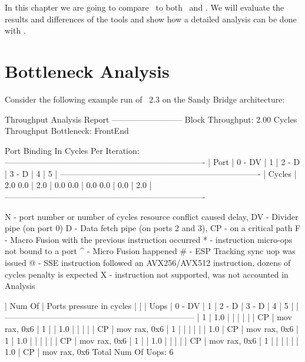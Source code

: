 In this chapter we are going to compare \suaca\ to both \iaca\ and \osaca. We will evaluate the results and differences of the tools and show how a detailed analysis can be done with \suaca.

\section{Bottleneck Analysis}

Consider the following example run of \iaca\ $2.3$ on the Sandy Bridge architecture:

\begin{example}
        Throughput Analysis Report
        --------------------------
        Block Throughput: 2.00 Cycles       Throughput Bottleneck: FrontEnd
        
        Port Binding In Cycles Per Iteration:
        -------------------------------------------------------------------------
        |  Port  |  0   -  DV  |  1   |  2   -  D   |  3   -  D   |  4   |  5   |
        -------------------------------------------------------------------------
        | Cycles | 2.0    0.0  | 2.0  | 0.0    0.0  | 0.0    0.0  | 0.0  | 2.0  |
        -------------------------------------------------------------------------
        
        N - port number or number of cycles resource conflict caused delay, DV - Divider pipe (on port 0)
        D - Data fetch pipe (on ports 2 and 3), CP - on a critical path
        F - Macro Fusion with the previous instruction occurred
        * - instruction micro-ops not bound to a port
        ^ - Micro Fusion happened
        # - ESP Tracking sync uop was issued
        @ - SSE instruction followed an AVX256/AVX512 instruction, dozens of cycles penalty is expected
        X - instruction not supported, was not accounted in Analysis
        
        | Num Of |              Ports pressure in cycles               |    |
        |  Uops  |  0  - DV  |  1  |  2  -  D  |  3  -  D  |  4  |  5  |    |
        ---------------------------------------------------------------------
        |   1    | 1.0       |     |           |           |     |     | CP | mov rax, 0x6
        |   1    |           | 1.0 |           |           |     |     | CP | mov rax, 0x6
        |   1    |           |     |           |           |     | 1.0 | CP | mov rax, 0x6
        |   1    | 1.0       |     |           |           |     |     | CP | mov rax, 0x6
        |   1    |           | 1.0 |           |           |     |     | CP | mov rax, 0x6
        |   1    |           |     |           |           |     | 1.0 | CP | mov rax, 0x6
        Total Num Of Uops: 6
\end{example}

